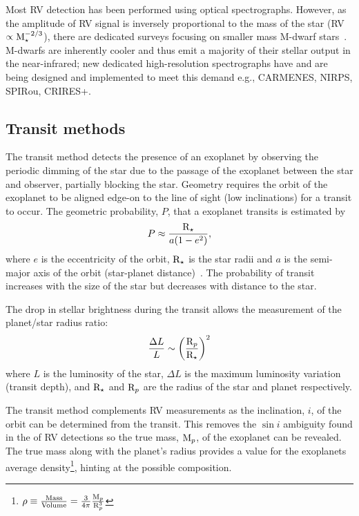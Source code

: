 Most {RV} detection has been performed using optical spectrographs.
However, as the amplitude of {RV} signal is inversely proportional to the mass of the star (RV $\propto \textrm{M}_{\star}^{-2/3}$), there are dedicated surveys focusing on smaller mass M-dwarf stars~\citep[e.g.][]{reiners_carmenes_2018}.
M-dwarfs are inherently cooler and thus emit a majority of their stellar output in the near-infrared; new dedicated high-resolution \nir{} spectrographs have and are being designed and implemented to meet this demand e.g., {CARMENES}, {NIRPS}, {SPIRou}, {CRIRES+}.


\subsection{Transit methods}
\label{sub:transit}
The transit method detects the presence of an exoplanet by observing the periodic dimming of the star due to the passage of the exoplanet between the star and observer, partially blocking the star.
Geometry requires the orbit of the exoplanet to be aligned edge-on to the line of sight (low inclinations) for a transit to occur.
The geometric probability, $P$, that a exoplanet transits is estimated by
\begin{equation}
P \approx \frac{\textrm{R}_{\star}}{a (1-{e}^{2})},
\end{equation}
where \(e\) is the eccentricity of the orbit, $\textrm{R}_{\star}$ is the star radii and \(a\) is the semi-major axis of the orbit (star-planet distance)~\citep{barnes_effects_2007}.
The probability of transit increases with the size of the star but decreases with distance to the star.

The drop in stellar brightness during the transit allows the measurement of the planet/star radius ratio:
\begin{equation}
    \frac{\Delta L}{L} \sim {\left(\frac{\textrm{R}_{p}}{\textrm{R}_{\star}}\right)}^{2}
\end{equation}
where \(L\) is the luminosity of the star, \(\Delta L\) is the maximum luminosity variation (transit depth), and \(\textrm{R}_{\star}\) and \(\textrm{R}_{p}\) are the radius of the star and planet respectively.

The transit method complements {RV} measurements as the inclination, $i$, of the orbit can be determined from the transit.
This removes the {$\sin{i}$} ambiguity found in the \Mpsini{} of {RV} detections so the true mass, $\textrm{M}_{p}$, of the exoplanet can be revealed.
The true mass along with the planet's radius provides a value for the exoplanets average density\footnote{$\rho \equiv \frac{ \textrm{Mass}}{\textrm{Volume}} = \frac{3}{4\pi}\frac{\textrm{M}_{p}}{\textrm{R}_{p}^{3}}$}, hinting at the possible composition.

